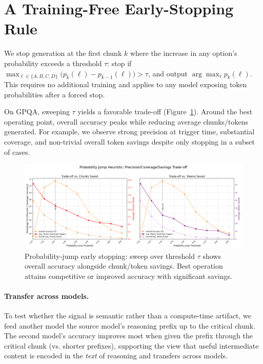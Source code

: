 \documentclass{article}
\begin{document}
\section{A Training-Free Early-Stopping Rule}
\label{sec:heuristic}

We stop generation at the first chunk $k$ where the increase in any option’s probability exceeds a threshold $\tau$: stop if $\max_{\ell \in \{A,B,C,D\}} \big( p_k(\ell) - p_{k-1}(\ell) \big) > \tau$, and output $\arg\max_{\ell} p_k(\ell)$. This requires no additional training and applies to any model exposing token probabilities after a forced stop.

On GPQA, sweeping $\tau$ yields a favorable trade-off (Figure~\ref{fig:tradeoff}). Around the best operating point, overall accuracy peaks while reducing average chunks/tokens generated. For example, we observe strong precision at trigger time, substantial coverage, and non-trivial overall token savings despite only stopping in a subset of cases.

\begin{figure}[t]
    \centering
    \includegraphics[width=0.95\linewidth]{analysis_results/jump_heuristic/jump_heuristic_tradeoff_reasoning_traces_gpqa_Qwen_Qwen3-32B.png}
    \caption{Probability-jump early stopping: sweep over threshold $\tau$ shows overall accuracy alongside chunk/token savings. Best operation attains competitive or improved accuracy with significant savings.}
    \label{fig:tradeoff}
\end{figure}

\paragraph{Transfer across models.} To test whether the signal is semantic rather than a compute-time artifact, we feed another model the source model’s reasoning prefix up to the critical chunk. The second model’s accuracy improves most when given the prefix through the critical chunk (vs. shorter prefixes), supporting the view that useful intermediate content is encoded in the \emph{text} of reasoning and transfers across models.
\end{document}
